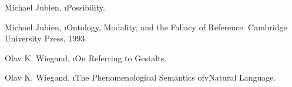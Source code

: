 \begin{thebibliography}{99}

Michael Jubien, \i{Possibility}.

Michael Jubien, \i{Ontology, Modality, and the
Fallacy of Reference}.  Cambridge University Press, 1993.

Olav K. Wiegand, \i{On Referring to Gestalts}.

Olav K. Wiegand, \i{The Phenomenological Semantics 
ofvNatural Language}.


\end{thebibliography}
